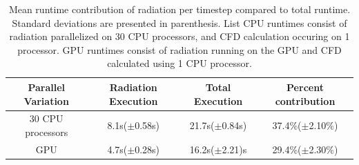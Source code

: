 \begin{table}[h!]
\centering
\caption{Mean runtime contribution of radiation per timestep compared to total runtime. Standard deviations are presented in parenthesis. List CPU runtimes consist of radiation parallelized on 30 CPU processors, and CFD calculation occuring on 1 processor. GPU runtimes consist of radiation running on the GPU and CFD calculated using 1 CPU processor.}
\begin{tabular}{c c c c} 
 \hline
 Parallel Variation & Radiation Execution & Total Execution & Percent contribution \\ [0.5ex] 
 \hline
 30 CPU processors & 8.1s($\pm{}$0.58s) & 21.7s($\pm{}$0.84s) & 37.4\%($\pm{}$2.10\%) \\ 
 GPU & 4.7s($\pm$0.28s) & 16.2s($\pm$2.21)s & 29.4\%($\pm$2.30\%) \\
 \hline
\end{tabular}
\label{table:PoolFireTransient_runtime_table_1rpc}
\end{table}





